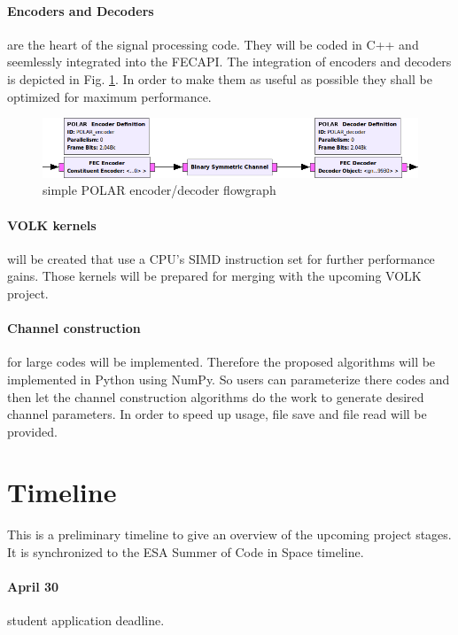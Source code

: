 \documentclass[a4paper,12pt]{scrartcl}
\begin{document}
\paragraph{Encoders and Decoders} are the heart of the signal processing code.
They will be coded in C++ and seemlessly integrated into the FECAPI.
The integration of encoders and decoders is depicted in Fig. \ref{fig:polar_mockup}.
In order to make them as useful as possible they shall be optimized for maximum performance.

\begin{figure}[tbh]
 \includegraphics[width=\textwidth]{figure/POLAR_mockup.png}
 \caption{simple POLAR encoder/decoder flowgraph}
 \label{fig:polar_mockup}
\end{figure}

\paragraph{VOLK kernels} will be created that use a CPU's SIMD instruction set for further performance gains.
Those kernels will be prepared for merging with the upcoming VOLK project.

\paragraph{Channel construction} for large codes will be implemented.
Therefore the proposed algorithms \cite{tal2013construct} will be implemented in Python using NumPy.
So users can parameterize there codes and then let the channel construction algorithms do the work to generate desired channel parameters.
In order to speed up usage, file save and file read will be provided.


\section{Timeline}
This is a preliminary timeline to give an overview of the upcoming project stages.
It is synchronized to the ESA Summer of Code in Space timeline.

\paragraph{April 30} student application deadline.
\end{document}
